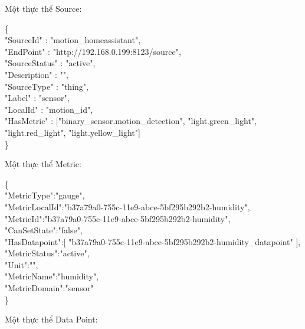 \hspace{0mm}Một thực thể Source:

\{\\
\blank{1cm}"SourceId" : "motion\_homeassistant",\\
\blank{1cm}"EndPoint" : "http://192.168.0.199:8123/source",\\
\blank{1cm}"SourceStatus" : "active",\\
\blank{1cm}"Description" : "",\\
\blank{1cm}"SourceType" : "thing",\\
\blank{1cm}"Label" : "sensor",\\
\blank{1cm}"LocalId" : "motion\_id",\\
\blank{1cm}"HasMetric" : ["binary\_sensor.motion\_detection", "light.green\_light", "light.red\_light", "light.yellow\_light"] \\
\}

\hspace{0mm}Một thực thể Metric:
\clearpage

\{\\
\blank{1cm}"MetricType":"gauge",\\
\blank{1cm}"MetricLocalId":"b37a79a0-755c-11e9-abce-5bf295b292b2-humidity",\\
\blank{1cm}"MetricId":"b37a79a0-755c-11e9-abce-5bf295b292b2-humidity",\\
\blank{1cm}"CanSetState":"false",\\
\blank{1cm}"HasDatapoint":[
        "b37a79a0-755c-11e9-abce-5bf295b292b2-humidity\_datapoint"
    ],\\
\blank{1cm}"MetricStatus":"active",\\
\blank{1cm}"Unit":"",\\
\blank{1cm}"MetricName":"humidity",\\
\blank{1cm}"MetricDomain":"sensor"\\
\}

\hspace{0mm}Một thực thể Data Point:


